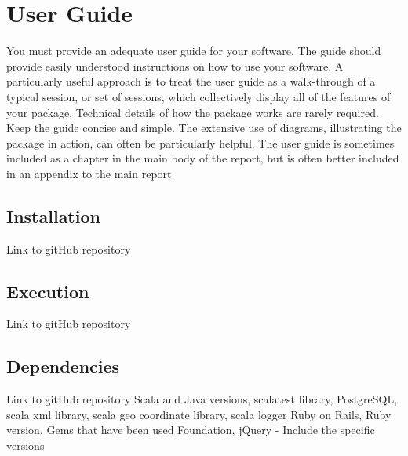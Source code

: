 \chapter{User Guide}
You must provide an adequate user guide for your software. The guide should provide easily understood instructions on how to use your software. A particularly useful approach is to treat the user guide as a walk-through of a typical session, or set of sessions, which collectively display all of the features of your package. Technical details of how the package works are rarely required. Keep the guide concise and simple. The extensive use of diagrams, illustrating the package in action, can often be particularly helpful. The user guide is sometimes included as a chapter in the main body of the report, but is often better included in an appendix to the main report.
\section{Installation}
Link to gitHub repository
\section{Execution}
Link to gitHub repository
\section{Dependencies}
Link to gitHub repository
Scala and Java versions, scalatest library, PostgreSQL, scala xml library, scala geo coordinate library, scala logger
Ruby on Rails, Ruby version, Gems that have been used
Foundation, jQuery - Include the specific versions